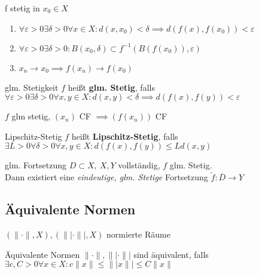 \begin{bemerkung}
  f stetig in $x_0 \in X$
  \begin{enumerate}[label= $\Leftrightarrow$]
    \item $\forall \varepsilon >0 \exists \delta >0 \forall x \in X:
      d(x,x_0)<\delta \implies d(f(x),f(x_0)) < \varepsilon$
    \item $\forall \varepsilon >0 \exists \delta >0:
      B(x_0,\delta) \subset f^{-1}(B(f(x_0)), \varepsilon)$
    \item $x_n \to x_0 \implies f(x_n) \to f(x_0)$
  \end{enumerate}
\end{bemerkung}

\begin{definition}{glm. Stetigkeit}
  $f$ heißt \textbf{glm. Stetig}, falls
  $\forall \varepsilon >0 \exists \delta >0 \forall x,y \in X:
  d(x,y) < \delta \implies d(f(x),f(y)) < \varepsilon$
\end{definition}

\begin{bemerkung}
    $f$ glm stetig, $(x_n)$ CF $\implies (f(x_n))$ CF
\end{bemerkung}

\begin{definition}{Lipschitz-Stetig}
  $f$ heißt \textbf{Lipschitz-Stetig}, falls
  $\exists L >0 \forall \delta >0 \forall x,y \in X:
  d(f(x),f(y)) \leq L d(x,y)$
\end{definition}

\begin{satz}{glm. Fortsetzung}
  $D\subset X,\ X,Y$ vollständig, $f$ glm. Stetig.\\
  Dann existiert eine \textit{eindeutige, glm. Stetige} Fortsetzung
  $\tilde{f}: \overline{D} \to Y$
\end{satz}



\subsection{Äquivalente Normen}

$(\|\cdot\|, X), (\||\cdot\||, X)$ normierte Räume\\

\begin{definition}{Äquivalente Normen}
  $\|\cdot\|, \||\cdot\||$ sind äquivalent, falls
  $\exists c,C>0 \forall x\in X: c\|x\| \leq \||x\|| \leq C \|x\|$
\end{definition}

